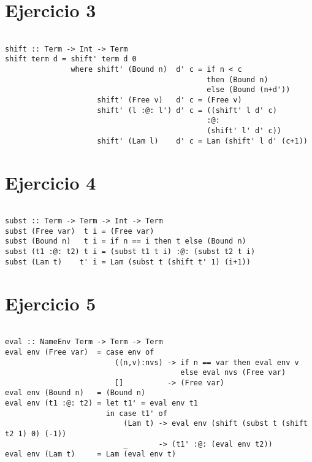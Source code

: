 \documentclass[a4paper]{article}
\begin{document}
\section*{Ejercicio 3}
\begin{verbatim}

shift :: Term -> Int -> Term
shift term d = shift' term d 0
               where shift' (Bound n)  d' c = if n < c 
                                              then (Bound n)
                                              else (Bound (n+d'))
                     shift' (Free v)   d' c = (Free v)
                     shift' (l :@: l') d' c = ((shift' l d' c)
                                              :@:
                                              (shift' l' d' c))
                     shift' (Lam l)    d' c = Lam (shift' l d' (c+1))

\end{verbatim}


\newpage


\section*{Ejercicio 4}
\begin{verbatim}

subst :: Term -> Term -> Int -> Term
subst (Free var)  t i = (Free var)
subst (Bound n)   t i = if n == i then t else (Bound n)
subst (t1 :@: t2) t i = (subst t1 t i) :@: (subst t2 t i)
subst (Lam t)    t' i = Lam (subst t (shift t' 1) (i+1))

\end{verbatim}


\section*{Ejercicio 5}
\begin{verbatim}

eval :: NameEnv Term -> Term -> Term
eval env (Free var)  = case env of
                         ((n,v):nvs) -> if n == var then eval env v
                                        else eval nvs (Free var)
                         []          -> (Free var)
eval env (Bound n)   = (Bound n)
eval env (t1 :@: t2) = let t1' = eval env t1
                       in case t1' of
                           (Lam t) -> eval env (shift (subst t (shift t2 1) 0) (-1))
                           _       -> (t1' :@: (eval env t2))
eval env (Lam t)     = Lam (eval env t)

\end{verbatim}
\end{document}
